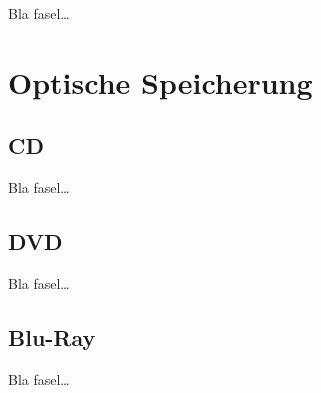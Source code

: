             Bla fasel\ldots
    
    
    \section{Optische Speicherung}
    \label{ch:Technisch:sec:Optische Speicherung}
        \subsection{CD}
        \label{ch:Technisch:sec:Optische Speicherung:sub:CD}
        
            Bla fasel\ldots
        
        \subsection{DVD}
        \label{ch:Technisch:sec:Optische Speicherung:sub:DVD}
        
            Bla fasel\ldots
        
        \subsection{Blu-Ray}
        \label{ch:Technisch:sec:Optische Speicherung:sub:Blu-Ray}
        
            Bla fasel\ldots

